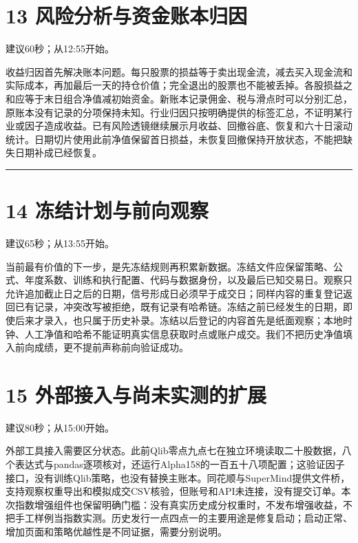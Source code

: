\documentclass[UTF8,a4paper,12pt]{ctexart}
\begin{document}
\newpage

\section*{\color{ink}13  风险分析与资金账本归因}

{\small\color{accent}建议60秒；从12:55开始。}\par

收益归因首先解决账本问题。每只股票的损益等于卖出现金流，减去买入现金流和实际成本，再加最后一天的持仓价值；完全退出的股票也不能被丢掉。各股损益之和应等于末日组合净值减初始资金。新账本记录佣金、税与滑点时可以分别汇总，原账本没有记录的分项保持未知。行业归因只按明确提供的标签汇总，不证明某行业或因子造成收益。已有风险透镜继续展示月收益、回撤谷底、恢复和六十日滚动统计。日期切片使用此前净值保留首日损益，未恢复回撤保持开放状态，不能把缺失日期补成已经恢复。


\vspace{4mm}\noindent\textcolor{accent!40}{\rule{\textwidth}{0.4pt}}\par

\section*{\color{ink}14  冻结计划与前向观察}

{\small\color{accent}建议65秒；从13:55开始。}\par

当前最有价值的下一步，是先冻结规则再积累新数据。冻结文件应保留策略、公式、年度系数、训练和执行配置、代码与数据身份，以及最后已知交易日。观察只允许追加截止日之后的日期，信号形成日必须早于成交日；同样内容的重复登记返回已有记录，冲突改写被拒绝，既有记录有哈希链。冻结之前已经发生的日期，即使后来才录入，也只属于历史补录。冻结以后登记的内容首先是纸面观察；本地时钟、人工净值和哈希不能证明真实信息获取时点或账户成交。我们不把历史净值填入前向成绩，更不提前声称前向验证成功。


\newpage

\section*{\color{ink}15  外部接入与尚未实测的扩展}

{\small\color{accent}建议80秒；从15:00开始。}\par

外部工具接入需要区分状态。此前Qlib零点九点七在独立环境读取二十股数据，八个表达式与pandas逐项核对，还运行Alpha158的一百五十八项配置；这验证因子接口，没有训练Qlib策略，也没有替换主账本。同花顺与SuperMind提供文件桥，支持观察权重导出和模拟成交CSV核验，但账号和API未连接，没有提交订单。本次指数增强组件也保留明确门槛：没有真实历史成分权重时，不发布增强收益，不把手工样例当指数实测。历史发行一点四点一的主要用途是修复启动；启动正常、增加页面和策略优越性是不同证据，需要分别说明。
\end{document}
